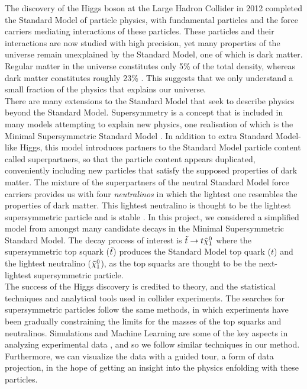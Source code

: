 The discovery of the Higgs boson at the Large Hadron Collider in 2012 \cite{chatrchyan2012observation,aad2012observation} completed the Standard Model of particle physics, with fundamental particles and the force carriers mediating interactions of these particles. These particles and their interactions are now studied with high precision, yet many properties of the universe remain unexplained by the Standard Model, one of which is dark matter. Regular matter in the universe constitutes only 5\% of the total density, whereas dark matter constitutes roughly 23\% \cite{thomson2013modern}. This suggests that we only understand a small fraction of the physics that explains our universe.  \\

There are many extensions to the Standard Model that seek to describe physics beyond the Standard Model. Supersymmetry is a concept that is included in many models attempting to explain new physics, one realisation of which is the Minimal Supersymmetric Standard Model \cite{martin1997supersymmetry}. In addition to extra Standard Model-like Higgs, this model introduces partners to the Standard Model particle content called superpartners, so that the particle content appears duplicated, conveniently including new particles that satisfy the supposed properties of dark matter. The mixture of the superpartners of the neutral Standard Model force carriers provides us with four \textit{neutralinos} in which the lightest one resembles the properties of dark matter. This lightest neutralino is thought to be the lightest supersymmetric particle and is stable \cite{martin1997supersymmetry}. In this project, we considered a simplified model from amongst many candidate decays in the Minimal Supersymmetric Standard Model. The decay process of interest is $\Tilde{t}\rightarrow t\Tilde{\chi}_1^0$ where the supersymmetric top squark ($\Tilde{t}$) produces the Standard Model top quark ($t$) and the lightest neutralino ($\Tilde{\chi}_1^0$), as the top squarks are thought to be the next-lightest supersymmetric particle. \\

The success of the Higgs discovery is credited to theory, and the statistical techniques and analytical tools used in collider experiments. The searches for supersymmetric particles follow the same methods, in which experiments have been gradually constraining the limits for the masses of the top squarks and neutralinos. Simulations and Machine Learning are some of the key aspects in analyzing experimental data \cite{chatrchyan2012observation,aad2012observation}, and so we follow similar techniques in our method. Furthermore, we can visualize the data with a guided tour, a form of data projection, in the hope of getting an insight into the physics enfolding with these particles. \\

